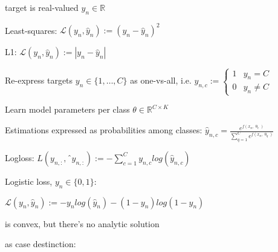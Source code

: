 \documentclass[landscape, a4paper]{article}
\begin{document}
\begin{minipage}[t]{0.2\linewidth}
\begin{betterlist}
	\end{betterlist}
	\begin{betterlist}
		\item {}
		\begin{betterlist}
			\item target is real-valued $y_n\in \mathbb{R}$
			\item \alert{Least-squares:} $\mathcal{L}(y_n, \hat y_n) := (y_n - \hat y_n)^2$
			\item \alert{L1:} $\mathcal{L}(y_n, \hat y_n) := |y_n - \hat y_n|$
		\end{betterlist}
		\item {}
		\begin{betterlist}
			\item Re-express targets $y_n \in \{1, \ldots , C\}$ as one-vs-all, i.e. $y_{n, c} := \begin{cases}
					1 & y_n = C    \\
					0 & y_n \neq C
				\end{cases}$
			\item Learn model parameters per class $\theta \in \mathbb{R}^{C\times K}$
			\item Estimations expressed as probabilities among classes: $\displaystyle\hat y_{n,c} = \frac{e^{f(x_n,\uptheta_c)}}{\sum^{C}_{q=1} e^{f(x_n,\uptheta_q)}}$
			\item Logloss: $\displaystyle L(y_{n,:}, ˆy_{n,:}) := −\sum^{C}_{c=1} y_{n,c} log(\hat y_{n,c})$
			\item {}
			\begin{betterlist}
				\item \alert{Logistic loss}, $y_n\in\{0, 1\}$:
				\begin{betterlist}
					\item $\mathcal{L}(y_n, \hat y_n) := -y_n log(\hat y_n) - (1 - y_n)log(1-\hat y_n)$
					\item is \alert{convex}, but there's no analytic solution
					\item \alert{as case destinction:}\\
\end{betterlist}
\end{betterlist}
\end{betterlist}
\end{betterlist}
\end{minipage}
\end{document}
